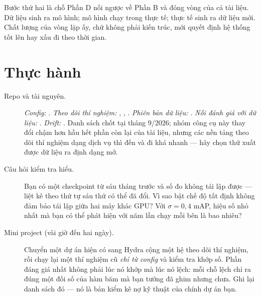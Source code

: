 \documentclass[../../deep_learning.tex]{subfiles}
\begin{document}
Bước thứ hai là chỗ Phần D nối ngược về Phần B và đóng vòng của cả tài liệu. Dữ liệu sinh ra mô hình; mô hình chạy trong thực tế; thực tế sinh ra dữ liệu mới. Chất lượng của vòng lặp ấy, chứ không phải kiến trúc, mới quyết định hệ thống tốt lên hay xấu đi theo thời gian.


\section{Thực hành}
\begin{description}
\item[Repo và tài nguyên.] \emph{Config:} . \emph{Theo dõi thí nghiệm:} , , . \emph{Phiên bản dữ liệu:} . \emph{Nối đánh giá với dữ liệu:} . \emph{Drift:} . Danh sách chốt tại tháng 9/2026; nhóm công cụ này thay đổi chậm hơn hầu hết phần còn lại của tài liệu, nhưng các nền tảng theo dõi thí nghiệm dạng dịch vụ thì đến và đi khá nhanh --- hãy chọn thứ xuất được dữ liệu ra định dạng mở.

\item[Câu hỏi kiểm tra hiểu.] Bạn có một checkpoint từ sáu tháng trước và số đo không tái lập được --- liệt kê theo thứ tự sáu thứ có thể đã đổi. Vì sao bật chế độ tất định không đảm bảo tái lập giữa hai máy khác GPU? Với $\sigma = 0{,}4$ mAP, hiệu số nhỏ nhất mà bạn có thể phát hiện với năm lần chạy mỗi bên là bao nhiêu?

\item[Mini project (vài giờ đến hai ngày).] Chuyển một dự án hiện có sang Hydra cộng một hệ theo dõi thí nghiệm, rồi chạy lại một thí nghiệm cũ \emph{chỉ từ config} và kiểm tra khớp số. Phần đáng giá nhất không phải lúc nó khớp mà lúc nó lệch: mỗi chỗ lệch chỉ ra đúng một đối số của hàm băm mà bạn tưởng đã ghim nhưng chưa. Ghi lại danh sách đó --- nó là bản kiểm kê nợ kỹ thuật của chính dự án bạn.
\end{description}
\end{document}
